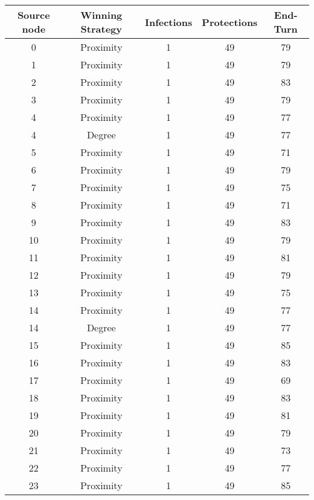 \documentclass[results.tex]{subfiles}
\begin{document}
\begin{center}
  \begin{tabular}{| c || c | c | c | c |}
    \hline
    {\bfseries Source node} & {\bfseries Winning Strategy} & {\bfseries Infections} & {\bfseries Protections} & {\bfseries End-Turn} \\  %
    \hline\hline
    0 & Proximity & 1 & 49 & 79 \\ 
    \hline
    1 & Proximity & 1 & 49 & 79 \\ 
    \hline
    2 & Proximity & 1 & 49 & 83 \\ 
    \hline
    3 & Proximity & 1 & 49 & 79 \\ 
    \hline
    4 & Proximity & 1 & 49 & 77 \\ 
    \hline
    4 & Degree & 1 & 49 & 77 \\ 
    \hline
    5 & Proximity & 1 & 49 & 71 \\ 
    \hline
    6 & Proximity & 1 & 49 & 79 \\ 
    \hline
    7 & Proximity & 1 & 49 & 75 \\ 
    \hline
    8 & Proximity & 1 & 49 & 71 \\ 
    \hline
    9 & Proximity & 1 & 49 & 83 \\ 
    \hline
    10 & Proximity & 1 & 49 & 79 \\ 
    \hline
    11 & Proximity & 1 & 49 & 81 \\ 
    \hline
    12 & Proximity & 1 & 49 & 79 \\ 
    \hline
    13 & Proximity & 1 & 49 & 75 \\ 
    \hline
    14 & Proximity & 1 & 49 & 77 \\ 
    \hline
    14 & Degree & 1 & 49 & 77 \\ 
    \hline
    15 & Proximity & 1 & 49 & 85 \\ 
    \hline
    16 & Proximity & 1 & 49 & 83 \\ 
    \hline
    17 & Proximity & 1 & 49 & 69 \\ 
    \hline
    18 & Proximity & 1 & 49 & 83 \\ 
    \hline
    19 & Proximity & 1 & 49 & 81 \\ 
    \hline
    20 & Proximity & 1 & 49 & 79 \\ 
    \hline
    21 & Proximity & 1 & 49 & 73 \\ 
    \hline
    22 & Proximity & 1 & 49 & 77 \\ 
    \hline
    23 & Proximity & 1 & 49 & 85 \\ 

\end{tabular}
\end{center}
\end{document}
